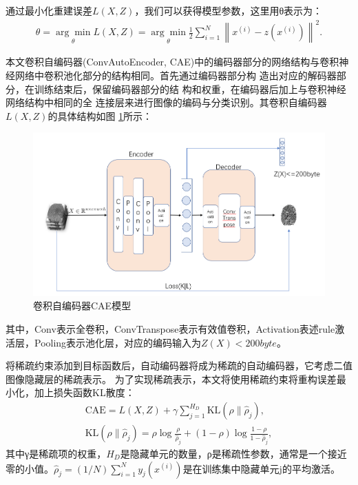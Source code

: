 \documentclass{whutmod}
\begin{document}
			通过最小化重建误差$L(X,Z)$，我们可以获得模型参数，这里用θ表示为：
			\begin{gather}
			\theta=\underset{\theta}{\arg \min } L(X, Z)=\underset{\theta}{\arg \min } \frac{1}{2} \sum_{i=1}^{N}\left\|x^{(i)}-z\left(x^{(i)}\right)\right\|^{2}.
			\end{gather}

			本文卷积自编码器(ConvAutoEncoder, CAE)中的编码器部分的网络结构与卷积神
			经网络中卷积池化部分的结构相同。首先通过编码器部分构
			造出对应的解码器部分，在训练结束后，保留编码器部分的结
			构和权重，在编码器后加上与卷积神经网络结构中相同的全
			连接层来进行图像的编码与分类识别。其卷积自编码器$L(X,Z)$的具体结构如图
			\ref{labssel}所示：
					\begin{figure}[H]
				\centering
				\includegraphics[width=\textwidth]{figures/model.png}
				\caption{卷积自编码器CAE模型}\label{labssel}
			\end{figure}
		其中，Conv表示全卷积，ConvTranspose表示有效值卷积，Activation表述rule激活层，Pooling表示池化层，对应的编码输入为$Z(X)<200byte$。
		
	
					将稀疏约束添加到目标函数后，自动编码器将成为稀疏的自动编码器，它考虑二值图像隐藏层的稀疏表示。 为了实现稀疏表示，本文将使用稀疏约束将重构误差最小化，加上损失函数KL散度：
								\begin{gather}
					 \mathrm{CAE}=L(X, Z)+\gamma \sum_{j=1}^{H_{D}} \mathrm{KL}\left(\rho \| \hat{\rho}_{j}\right),\\
					 \mathrm{KL}\left(\rho \| \hat{\rho}_{j}\right)=\rho \log \frac{\rho}{\hat{\rho}_{j}}+(1-\rho) \log \frac{1-\rho}{1-\hat{\rho}_{j}},
								\end{gather}
					其中γ是稀疏项的权重，$H_D$是隐藏单元的数量，ρ是稀疏性参数，通常是一个接近零的小值。$\hat{\rho}_{j}=(1 / N) \sum_{i=1}^{N} y_{j}\left(x^{(i)}\right)$是在训练集中隐藏单元j的平均激活。
\end{document}
